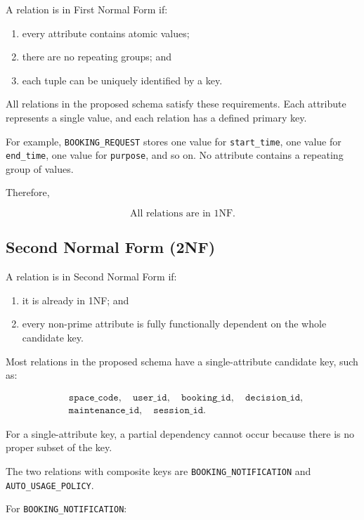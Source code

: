 A relation is in First Normal Form if:

\begin{enumerate}
    \item every attribute contains atomic values;
    \item there are no repeating groups; and
    \item each tuple can be uniquely identified by a key.
\end{enumerate}

All relations in the proposed schema satisfy these requirements.
Each attribute represents a single value, and each relation has a
defined primary key.

For example, \texttt{BOOKING\_REQUEST} stores one value for
\texttt{start\_time}, one value for \texttt{end\_time}, one value for
\texttt{purpose}, and so on. No attribute contains a repeating group
of values.

Therefore,

\[
\boxed{\text{All relations are in 1NF.}}
\]

\subsection{Second Normal Form (2NF)}

A relation is in Second Normal Form if:

\begin{enumerate}
    \item it is already in 1NF; and
    \item every non-prime attribute is fully functionally dependent on
    the whole candidate key.
\end{enumerate}

Most relations in the proposed schema have a single-attribute
candidate key, such as:

\[
\begin{aligned}
&\texttt{space\_code},\quad \texttt{user\_id},\quad
\texttt{booking\_id},\quad \texttt{decision\_id},\\
&\texttt{maintenance\_id},\quad \texttt{session\_id}.
\end{aligned}
\]

For a single-attribute key, a partial dependency cannot occur because
there is no proper subset of the key.

The two relations with composite keys are
\nolinkurl{BOOKING_NOTIFICATION} and \nolinkurl{AUTO_USAGE_POLICY}.

For \texttt{BOOKING\_NOTIFICATION}:

